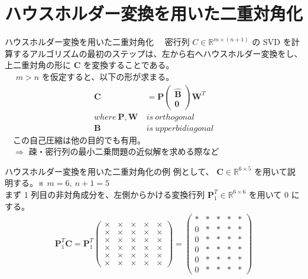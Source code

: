 \documentclass[dvipdfmx,10pt,presentation]{beamer}
\begin{document}
\section{ハウスホルダー変換を用いた二重対角化}
\label{sec:org0e5bc7f}
\begin{frame}[label={sec:org181a309}]{ハウスホルダー変換を用いた二重対角化}
　密行列 \(C\in\mathbb{R}^{m\times(n+1)}\) の SVD を計算するアルゴリズムの最初のステップは、左から右へハウスホルダー変換をし、上二重対角の形に \(\bm{C}\) を変換することである。\\
　 \(m > n\) を仮定すると、以下の形が求まる。\\

\begin{align*}
\bm{C} &= \bm{P}\begin{pmatrix}\hat{\bm{B}}\\\bm{0}\end{pmatrix}\bm{W}^T\\
where\ \bm{P}, \bm{W} \ &is\ orthogonal\\
      \bm{B} \ &is\ upper bidiagonal \tag{7.5}
\end{align*}
　この自己圧縮は他の目的でも有用。\\
　\(\Rightarrow\) 疎・密行列の最小二乗問題の近似解を求める際など\\
\end{frame}

\begin{frame}[allowframebreaks]{ハウスホルダー変換を用いた二重対角化の例}
例として、 \(\bm{C}\in\mathbb{R}^{6 \times 5}\) を用いて説明する。※ \(m = 6,\ n + 1 = 5\)\\
まず 1 列目の非対角成分を、左側からかける変換行列 \(\bm{P}^T_1\in\mathbb{R}^{6\times6}\) を用いて 0 にする。\\

\begin{align*}
\bm{P}^T_1 \bm{C} = \bm{P}^T_1
\begin{pmatrix}
\times & \times & \times & \times & \times \\
\times & \times & \times & \times & \times \\
\times & \times & \times & \times & \times \\
\times & \times & \times & \times & \times \\
\times & \times & \times & \times & \times \\
\times & \times & \times & \times & \times
\end{pmatrix}
=
\begin{pmatrix}
\ast & \ast & \ast & \ast & \ast \\
0 & \ast & \ast & \ast & \ast \\
0 & \ast & \ast & \ast & \ast \\
0 & \ast & \ast & \ast & \ast \\
0 & \ast & \ast & \ast & \ast \\
0 & \ast & \ast & \ast & \ast 
\end{pmatrix}
\end{align*}
\end{frame}
\end{document}
